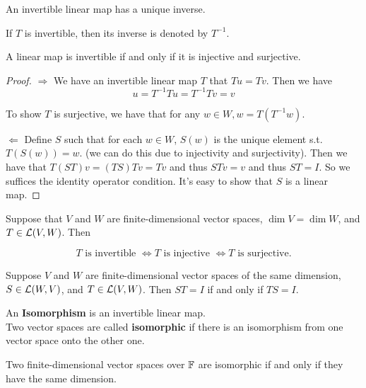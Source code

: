 \documentclass{extarticle}
\begin{document}
\begin{thm}
    An invertible linear map has a unique inverse. 
\end{thm}

If \(T\) is invertible, then its inverse is denoted by \(T^{-1}\). 


\begin{thm}
    A linear map is invertible if and only if it is injective and surjective. 
\end{thm}

\begin{proof}
\(\Rightarrow\) We have an invertible linear map \(T\) that \(T u = T v\). Then we have 
\[u = T^{-1} Tu = T^{-1} Tv = v\]

To show \(T\) is surjective, we have that for any \(w \in W, w = T(T^{-1}w)\). 

\(\Leftarrow\) Define \(S\) such that for each \(w \in W\), \(S(w)\) is the unique element 
s.t. \(T(S(w)) = w\). (we can do this due to injectivity and surjectivity). Then we have that 
\(T(ST)v = (TS)Tv = Tv\) and thus \(ST v = v\) and thus \(ST = I\). So we suffices the identity 
operator condition. It's easy to show that \(S\) is a linear map.

\end{proof}


\begin{thm}
    Suppose that \(V\) and \(W\) are finite-dimensional vector spaces, \(\dim V = \dim W\), 
    and \(T \in \mathcal{L}(V, W)\). Then 

    \[T \text{ is invertible } \Leftrightarrow T \text{ is injective } \Leftrightarrow T \text{ is surjective.}\]
\end{thm}

\begin{corollary}
    Suppose \(V\) and \(W\) are finite-dimensional vector spaces of the same dimension, \(S \in 
    \mathcal{L}(W, V)\), and \(T \in \mathcal{L}(V, W)\). Then \(ST = I\) if and only if \(TS = I\). 
\end{corollary}


\begin{definition}[Isomorphism]
    An \textbf{Isomorphism} is an invertible linear map. \\ 
    Two vector spaces are called \textbf{isomorphic} if there is an isomorphism from one vector space 
    onto the other one. 
\end{definition}


\begin{thm}
    Two finite-dimensional vector spaces over \(\mathbb{F}\) are isomorphic if and only if they have 
    the same dimension. 
\end{thm}
\end{document}
